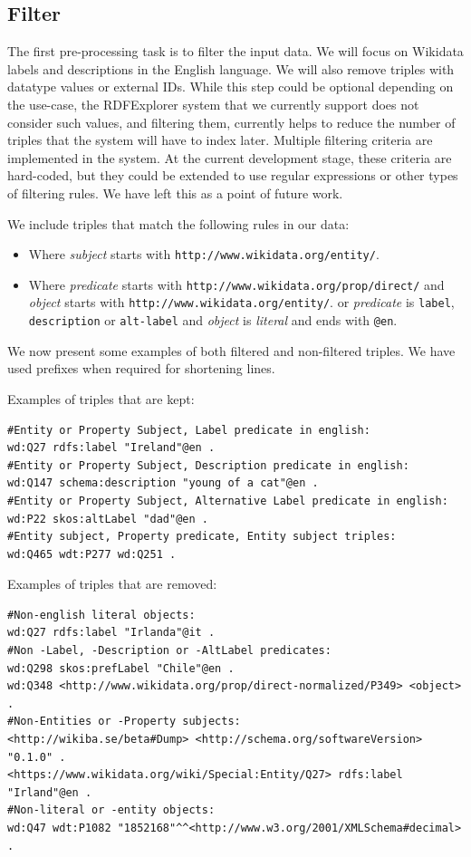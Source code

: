 \subsection{Filter}

The first pre-processing task is to filter the input data. 
We will focus on Wikidata labels and descriptions in the English language. 
We will also remove triples with datatype values or external IDs.
While this step could be optional depending on the use-case, the RDFExplorer system that we currently support does not consider such values, and filtering them, currently helps to reduce the number of triples that the system will have to index later. 
Multiple filtering criteria are implemented in the system. 
At the current development stage, these criteria are hard-coded, but they could be extended to use regular expressions or other types of filtering rules. We have left this as a point of future work.

We include triples that match the following rules in our data:
\begin{itemize}
    \item Where \textit{subject} starts with \texttt{http://www.wikidata.org/entity/}.
    \item Where \textit{predicate} starts with \texttt{http://www.wikidata.org/prop/direct/} 
            \subsubitem and \textit{object} starts with \texttt{http://www.wikidata.org/entity/}.
        \subitem or \textit{predicate} is \texttt{label}, \texttt{description} or \texttt{alt-label} 
            \subsubitem and \textit{object} is \textit{literal} and ends with \texttt{@en}.
\end{itemize}

\begin{example}
We now present some examples of both filtered and non-filtered triples.
We have used prefixes when required for shortening lines.

Examples of triples that are kept:
\begin{verbatim}
#Entity or Property Subject, Label predicate in english:
wd:Q27 rdfs:label "Ireland"@en .
#Entity or Property Subject, Description predicate in english:
wd:Q147 schema:description "young of a cat"@en .
#Entity or Property Subject, Alternative Label predicate in english:
wd:P22 skos:altLabel "dad"@en .
#Entity subject, Property predicate, Entity subject triples:
wd:Q465 wdt:P277 wd:Q251 .
\end{verbatim}

Examples of triples that are removed:
\begin{verbatim}
#Non-english literal objects:
wd:Q27 rdfs:label "Irlanda"@it .
#Non -Label, -Description or -AltLabel predicates:
wd:Q298 skos:prefLabel "Chile"@en .
wd:Q348 <http://www.wikidata.org/prop/direct-normalized/P349> <object> .
#Non-Entities or -Property subjects:
<http://wikiba.se/beta#Dump> <http://schema.org/softwareVersion> "0.1.0" .
<https://www.wikidata.org/wiki/Special:Entity/Q27> rdfs:label "Irland"@en .
#Non-literal or -entity objects:
wd:Q47 wdt:P1082 "1852168"^^<http://www.w3.org/2001/XMLSchema#decimal> .
\end{verbatim}
\end{example}

